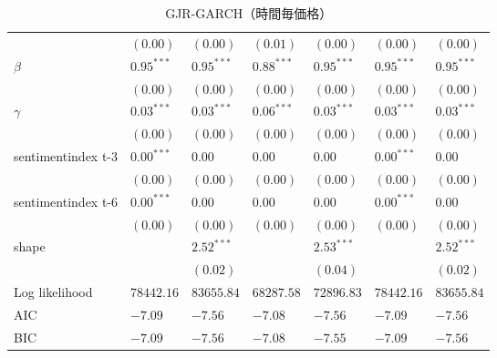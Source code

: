 \begin{landscape}
\begin{table}[]
\begin{tabular}{lllllll}
                   & $(0.00)$      & $(0.00)$      & $(0.01)$      & $(0.00)$      & $(0.00)$      & $(0.00)$      \\
$\beta$            & $0.95^{***}$  & $0.95^{***}$  & $0.88^{***}$  & $0.95^{***}$  & $0.95^{***}$  & $0.95^{***}$  \\
                   & $(0.00)$      & $(0.00)$      & $(0.00)$      & $(0.00)$      & $(0.00)$      & $(0.00)$      \\
$\gamma$           & $0.03^{***}$  & $0.03^{***}$  & $0.06^{***}$  & $0.03^{***}$  & $0.03^{***}$  & $0.03^{***}$  \\
                   & $(0.00)$      & $(0.00)$      & $(0.00)$      & $(0.00)$      & $(0.00)$      & $(0.00)$      \\
sentimentindex t-3 & $0.00^{***}$  & $0.00$        & $0.00$        & $0.00$        & $0.00^{***}$  & $0.00$        \\
                   & $(0.00)$      & $(0.00)$      & $(0.00)$      & $(0.00)$      & $(0.00)$      & $(0.00)$      \\
sentimentindex t-6 & $0.00^{***}$  & $0.00$        & $0.00$        & $0.00$        & $0.00^{***}$  & $0.00$        \\
                   & $(0.00)$      & $(0.00)$      & $(0.00)$      & $(0.00)$      & $(0.00)$      & $(0.00)$      \\
shape              &               & $2.52^{***}$  &               & $2.53^{***}$  &               & $2.52^{***}$  \\
                   &               & $(0.02)$      &               & $(0.04)$      &               & $(0.02)$      \\ \hline
Log likelihood     & $78442.16$    & $83655.84$    & $68287.58$    & $72896.83$    & $78442.16$    & $83655.84$    \\
AIC                & $-7.09$       & $-7.56$       & $-7.08$       & $-7.56$       & $-7.09$       & $-7.56$       \\
BIC                & $-7.09$       & $-7.56$       & $-7.08$       & $-7.55$       & $-7.09$       & $-7.56$       \\ \hline
\end{tabular}
\caption{GJR-GARCH（時間毎価格）}

\end{table}
\end{landscape}







